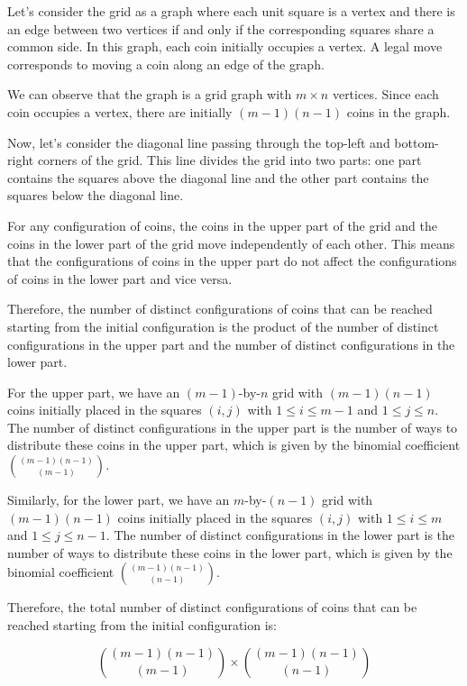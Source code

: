 Let's consider the grid as a graph where each unit square is a vertex and there is an edge between two vertices if and only if the corresponding squares share a common side. In this graph, each coin initially occupies a vertex. A legal move corresponds to moving a coin along an edge of the graph.

We can observe that the graph is a grid graph with \( m \times n \) vertices. Since each coin occupies a vertex, there are initially \( (m-1)(n-1) \) coins in the graph.

Now, let's consider the diagonal line passing through the top-left and bottom-right corners of the grid. This line divides the grid into two parts: one part contains the squares above the diagonal line and the other part contains the squares below the diagonal line.

For any configuration of coins, the coins in the upper part of the grid and the coins in the lower part of the grid move independently of each other. This means that the configurations of coins in the upper part do not affect the configurations of coins in the lower part and vice versa.

Therefore, the number of distinct configurations of coins that can be reached starting from the initial configuration is the product of the number of distinct configurations in the upper part and the number of distinct configurations in the lower part.

For the upper part, we have an \( (m-1) \)-by-\( n \) grid with \( (m-1)(n-1) \) coins initially placed in the squares \( (i,j) \) with \( 1 \leq i \leq m-1 \) and \( 1 \leq j \leq n \). The number of distinct configurations in the upper part is the number of ways to distribute these coins in the upper part, which is given by the binomial coefficient \( \binom{(m-1)(n-1)}{(m-1)} \).

Similarly, for the lower part, we have an \( m \)-by-\( (n-1) \) grid with \( (m-1)(n-1) \) coins initially placed in the squares \( (i,j) \) with \( 1 \leq i \leq m \) and \( 1 \leq j \leq n-1 \). The number of distinct configurations in the lower part is the number of ways to distribute these coins in the lower part, which is given by the binomial coefficient \( \binom{(m-1)(n-1)}{(n-1)} \).

Therefore, the total number of distinct configurations of coins that can be reached starting from the initial configuration is:

\[
\binom{(m-1)(n-1)}{(m-1)} \times \binom{(m-1)(n-1)}{(n-1)}
\]
